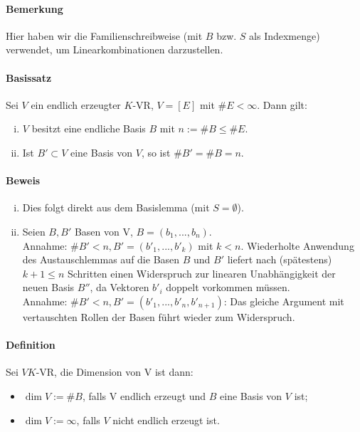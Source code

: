 \paragraph{Bemerkung}
    Hier haben wir die Familienschreibweise (mit $B$ bzw. $S$ als Indexmenge) verwendet, um Linearkombinationen darzustellen.
    
\paragraph{Basissatz}
    Sei $V$ ein endlich erzeugter $K$-VR, $V=[E]$ mit $\#E < \infty$. Dann gilt:
    \begin{enumerate}[(i)]
   		\item $V$ besitzt eine endliche Basis $B$ mit $n:= \#B \leq \#E$.
    	\item Ist $B'\subset V$ eine Basis von $V$, so ist $\#B' = \#B = n$.
    \end{enumerate}
    
\paragraph{Beweis}
    \begin{enumerate}[(i)]
        \item  Dies folgt direkt aus dem Basislemma (mit $S=\emptyset$).
        \item Seien $B,B'$ Basen von V, $B = (b_1,...,b_n)$.\\
        Annahme: $\#B' < n, B' = (b'_1,...,b'_k)$ mit $k < n$. Wiederholte Anwendung des Austauschlemmas auf die Basen $B$ und $B'$ liefert nach (spätestens) $k+1\leq n$ Schritten einen Widerspruch zur linearen Unabhängigkeit der neuen Basis $B''$, da Vektoren $b'_i$ doppelt vorkommen müssen.\\
        Annahme: $\#B' < n, B' = (b'_1,...,b'_n,b'_{n+1})$: Das gleiche Argument mit vertauschten Rollen der Basen führt wieder zum Widerspruch.
     \end{enumerate}

\paragraph{Definition}
    Sei $V K$-VR, die Dimension von V ist dann:
    \begin{itemize}
        \item $\dim V:= \#B$, falls V endlich erzeugt und $B$ eine Basis von $V$ ist;
        \item $\dim V:= \infty$, falls $V$ nicht endlich erzeugt ist.
    \end{itemize}
